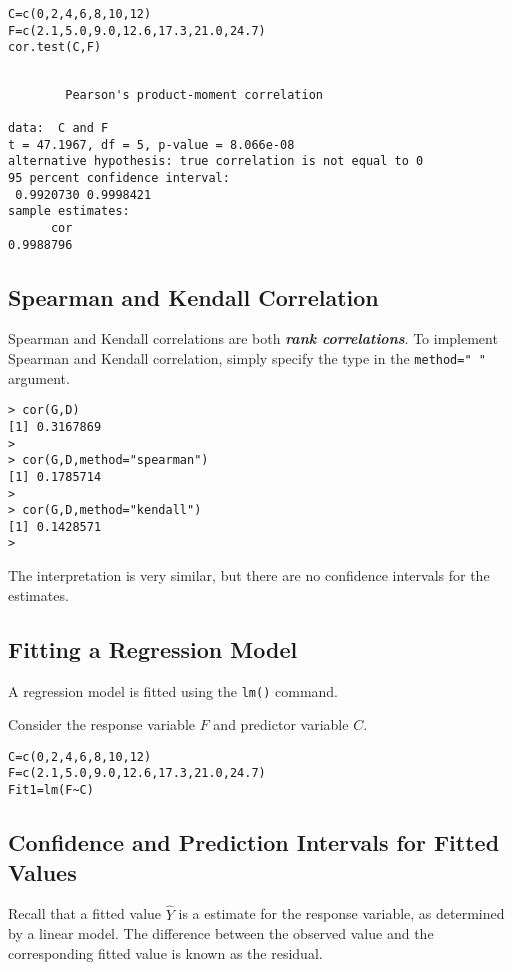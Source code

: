 \documentclass[a4paper,12pt]{article}
\begin{document}
\begin{itemize}
\begin{itemize}
\begin{framed}
\begin{verbatim}
C=c(0,2,4,6,8,10,12) 
F=c(2.1,5.0,9.0,12.6,17.3,21.0,24.7)
cor.test(C,F)
\end{verbatim}
\end{framed}
\begin{verbatim}

        Pearson's product-moment correlation

data:  C and F 
t = 47.1967, df = 5, p-value = 8.066e-08
alternative hypothesis: true correlation is not equal to 0 
95 percent confidence interval:
 0.9920730 0.9998421 
sample estimates:
      cor 
0.9988796 
\end{verbatim}


\subsection{Spearman and Kendall Correlation}
Spearman and Kendall correlations are both \textbf{\emph{rank correlations}}. 
To implement Spearman and Kendall correlation, simply specify the type in the \texttt{method=" "} argument.
\begin{verbatim}
> cor(G,D)
[1] 0.3167869
>
> cor(G,D,method="spearman")
[1] 0.1785714
>
> cor(G,D,method="kendall")
[1] 0.1428571
> 
\end{verbatim}
The interpretation is very similar, but there are no confidence intervals for the estimates.

\subsection{Fitting a Regression Model}
A regression model is fitted using the \texttt{lm()} command.

Consider the response variable $F$ and predictor variable $C$.
\begin{framed}
\begin{verbatim}
C=c(0,2,4,6,8,10,12) 
F=c(2.1,5.0,9.0,12.6,17.3,21.0,24.7)
Fit1=lm(F~C)
\end{verbatim}
\end{framed}


\subsection{Confidence and Prediction Intervals for Fitted Values} 

Recall that a fitted value $\hat{Y}$ is a estimate for the response variable, as determined by a linear model. The difference between the observed value and the corresponding fitted value is known as the residual.


\end{itemize}
\end{itemize}
\end{document}
